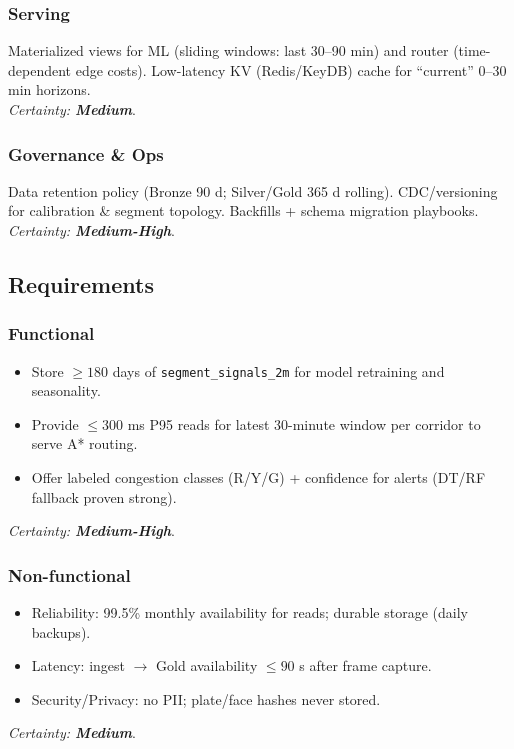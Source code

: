 \subsubsection{Serving}
Materialized views for ML (sliding windows: last 30--90 min) and router (time-dependent edge costs). Low-latency KV (Redis/KeyDB) cache for “current” 0--30 min horizons.\\
	\textit{Certainty: \textbf{Medium}}.

\subsubsection{Governance \& Ops}
Data retention policy (Bronze 90 d; Silver/Gold 365 d rolling). CDC/versioning for calibration \& segment topology. Backfills + schema migration playbooks.\\
	\textit{Certainty: \textbf{Medium-High}}.

\subsection{Requirements}
\subsubsection{Functional}
\begin{itemize}
  \item Store $\ge 180$ days of \texttt{segment\_signals\_2m} for model retraining and seasonality.
  \item Provide $\le 300$ ms P95 reads for latest 30-minute window per corridor to serve A* routing.
  \item Offer labeled congestion classes (R/Y/G) + confidence for alerts (DT/RF fallback proven strong).
\end{itemize}
	\textit{Certainty: \textbf{Medium-High}}.

\subsubsection{Non-functional}
\begin{itemize}
  \item Reliability: 99.5\% monthly availability for reads; durable storage (daily backups).
  \item Latency: ingest $\rightarrow$ Gold availability $\le 90$ s after frame capture.
  \item Security/Privacy: no PII; plate/face hashes never stored.
\end{itemize}
	\textit{Certainty: \textbf{Medium}}.

